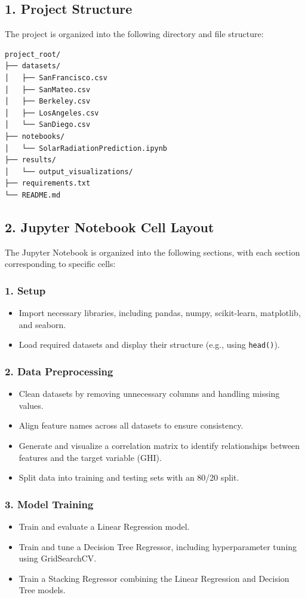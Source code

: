 \documentclass[10pt,twocolumn]{article}
\begin{document}
\begin{itemize}
\subsection*{1. Project Structure}
The project is organized into the following directory and file structure:
\begin{verbatim}
project_root/
├── datasets/
│   ├── SanFrancisco.csv
│   ├── SanMateo.csv
│   ├── Berkeley.csv
│   ├── LosAngeles.csv
│   └── SanDiego.csv
├── notebooks/
│   └── SolarRadiationPrediction.ipynb
├── results/
│   └── output_visualizations/
├── requirements.txt
└── README.md
\end{verbatim}

\subsection*{2. Jupyter Notebook Cell Layout}
The Jupyter Notebook is organized into the following sections, with each section corresponding to specific cells:

\subsubsection*{1. Setup}
\begin{itemize}
    \item Import necessary libraries, including pandas, numpy, scikit-learn, matplotlib, and seaborn.
    \item Load required datasets and display their structure (e.g., using \texttt{head()}).
\end{itemize}

\subsubsection*{2. Data Preprocessing}
\begin{itemize}
    \item Clean datasets by removing unnecessary columns and handling missing values.
    \item Align feature names across all datasets to ensure consistency.
    \item Generate and visualize a correlation matrix to identify relationships between features and the target variable (GHI).
    \item Split data into training and testing sets with an 80/20 split.
\end{itemize}

\subsubsection*{3. Model Training}
\begin{itemize}
    \item Train and evaluate a Linear Regression model.
    \item Train and tune a Decision Tree Regressor, including hyperparameter tuning using GridSearchCV.
    \item Train a Stacking Regressor combining the Linear Regression and Decision Tree models.
\end{itemize}


\end{itemize}
\end{document}
